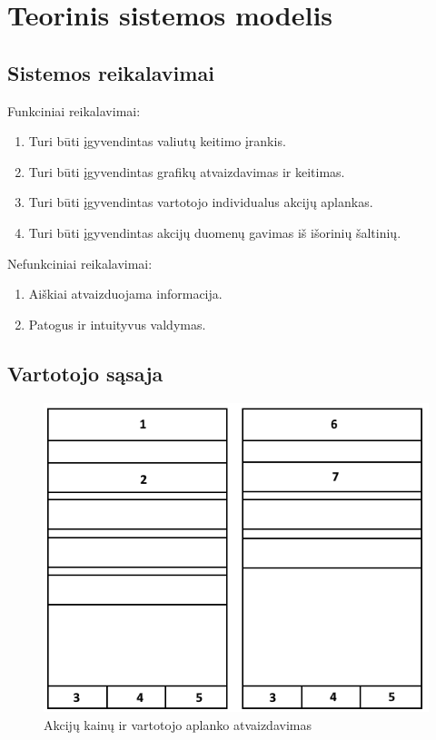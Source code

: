 \documentclass[a4paper,12pt,fleqn]{article}
\begin{document}
\newpage
\section{Teorinis sistemos modelis}
\subsection{Sistemos reikalavimai}
Funkciniai reikalavimai:
\begin{enumerate}[leftmargin=2cm]
	\item Turi būti įgyvendintas valiutų keitimo įrankis.
	\item Turi būti įgyvendintas grafikų atvaizdavimas ir keitimas.
	\item Turi būti įgyvendintas vartotojo individualus akcijų aplankas.
	\item Turi būti įgyvendintas akcijų duomenų gavimas iš išorinių šaltinių.
\end{enumerate}

Nefunkciniai reikalavimai:
\begin{enumerate}[leftmargin=2cm]
	\item Aiškiai atvaizduojama informacija.
	\item Patogus ir intuityvus valdymas.
\end{enumerate}

\subsection{Vartotojo sąsaja}
\begin{figure}[h]
	\centering
	\includegraphics[width=0.55\linewidth]{vartotojo-sasaja.png}
	\caption{Akcijų kainų ir vartotojo aplanko atvaizdavimas}
	\label{fig:sas1}
\end{figure}
\end{document}
